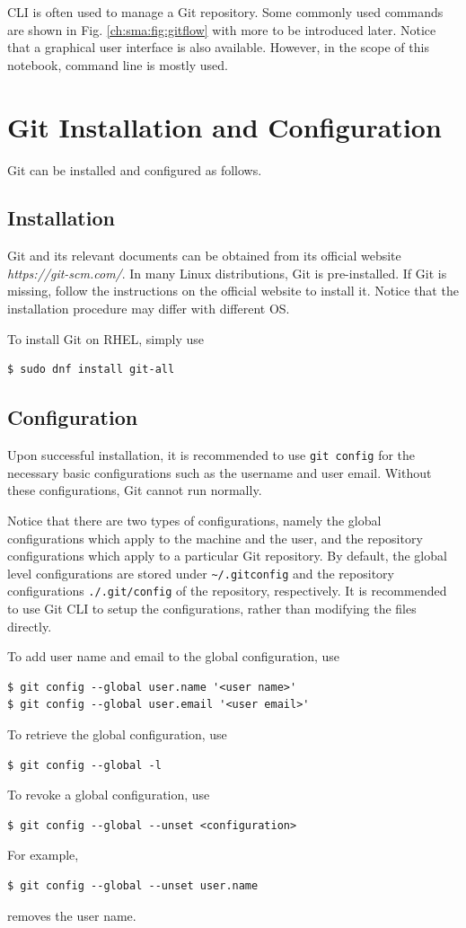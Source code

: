 CLI is often used to manage a Git repository. Some commonly used commands are shown in Fig. \ref{ch:sma:fig:gitflow} with more to be introduced later. Notice that a graphical user interface is also available. However, in the scope of this notebook, command line is mostly used.

\section{Git Installation and Configuration}

Git can be installed and configured as follows.

\subsection{Installation}

Git and its relevant documents can be obtained from its official website \textit{https://git-scm.com/}. In many Linux distributions, Git is pre-installed. If Git is missing, follow the instructions on the official website to install it. Notice that the installation procedure may differ with different OS.

To install Git on RHEL, simply use
\begin{lstlisting}
$ sudo dnf install git-all
\end{lstlisting}

\subsection{Configuration}

Upon successful installation, it is recommended to use \verb|git config| for the necessary basic configurations such as the username and user email. Without these configurations, Git cannot run normally.

Notice that there are two types of configurations, namely the global configurations which apply to the machine and the user, and the repository configurations which apply to a particular Git repository. By default, the global level configurations are stored under \verb|~/.gitconfig| and the repository configurations \verb|./.git/config| of the repository, respectively. It is recommended to use Git CLI to setup the configurations, rather than modifying the files directly.

To add user name and email to the global configuration, use
\begin{lstlisting}
$ git config --global user.name '<user name>'
$ git config --global user.email '<user email>'
\end{lstlisting}
To retrieve the global configuration, use
\begin{lstlisting}
$ git config --global -l
\end{lstlisting}
To revoke a global configuration, use
\begin{lstlisting}
$ git config --global --unset <configuration>
\end{lstlisting}
For example,
\begin{lstlisting}
$ git config --global --unset user.name
\end{lstlisting}
removes the user name.

